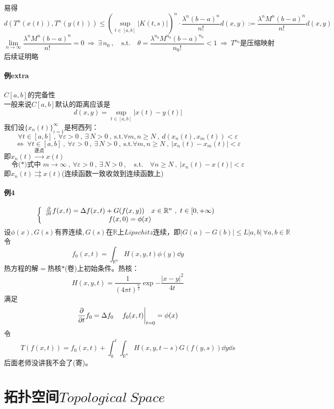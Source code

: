易得
\[d(T^n(x(t)),T^n(y(t))) \leq \left(\mathop {\text{sup}}\limits_{t \in [a,b]}\left|K(t,s)\right|\right)^n \cdot \frac{\lambda^n(b-a)^n}{n!}d(x,y):=\frac{\lambda^nM^n(b-a)^n}{n!}d(x,y)\]
\[\lim_{n \to \infty}\frac{\lambda^nM^n(b-a)^n}{n!}=0 \ \Rightarrow \ \exists \, n_0 \ , \quad \text{s.t.} \quad \theta=\frac{\lambda^{n_0}M^{n_0}(b-a)^{n_0}}{{n_0}!}<1 \ \Rightarrow \ T^{n_0}\text{是压缩映射}\]
后续证明略
\paragraph*{例extra} \quad $C[a,b]$的完备性 \\
一般来说$C[a,b]$默认的距离应该是
\[d(x,y)=\mathop {\text{sup}}\limits_{t \in [a,b]}|x(t)-y(t)|\]
我们设$\{x_n(t)\}_{i=1}^{\infty}$是柯西列：
\[\forall t \in [a,b] \ , \ \forall \varepsilon>0 \ , \ \exists \, N>0 \ , \ \text{s.t.} \forall m,n \geq N \ , \ d(x_n(t),x_m(t))<\varepsilon\]
\[\Leftrightarrow \ \forall t \in [a,b] \ , \ \forall \varepsilon>0 \ , \ \exists \, N>0 \ , \ \text{s.t.} \forall m,n \geq N \ , \ |x_n(t)-x_m(t)|<\varepsilon \tag{*}\]
即$x_n(t) \xrightarrow{\text{逐点}} x(t)$
\[\text{令(*)式中 }m \to \infty \ , \ \forall \varepsilon>0 \ , \ \exists \, N>0 \ , \quad \text{s.t.} \quad \forall n \geq N \ , \ |x_n(t)-x(t)|<\varepsilon\]
即$x_n(t) \rightrightarrows x(t)$(连续函数一致收敛到连续函数上)
\paragraph*{例4}
\[\left\{
\begin{array}{c}
    \pdv{}{t}f(x,t)=\Delta f(x,t)+G(f(x,y)) \quad x \in \mathbb{R}^n \ , \ t \in [0,+\infty) \\
    f(x,0)=\phi(x)
\end{array}
\right.\]
\[\text{设}\phi(x),G(s)\text{有界连续},G(s)\text{在}\mathbb{R}\text{上} 𝐿𝑖𝑝𝑠𝑐ℎ𝑖𝑡𝑧 \text{连续，即}|G(a)-G(b)| \leq L|a,b| \ \forall a,b \in \mathbb{R}\]
令
\[f_0(x,t)=\int_{\mathbb{R}^n}H(x,y,t)\phi(y)\dd y\]
热方程的解$=$热核$*$(卷)上初始条件。热核：
\[H(x,y,t)=\frac{1}{(4 \pi t)^{\frac{n}{2}}}\exp{-\frac{|x-y|^2}{4t}}\]
满足
\[\pdv{}{t}f_0=\Delta f_0 \quad \eval{f_0(x,t)}_{t=0}=\phi(x)\]
令
\[T(f(x,t))=f_0(x,t)+\int_0^t\int_{\mathbb{R}^n}H(x,y,t-s)G(f(y,s))\dd y\dd s\]
后面老师没讲我不会了(寄)。

\section{拓扑空间$Topological \ Space$} \label{topo}
